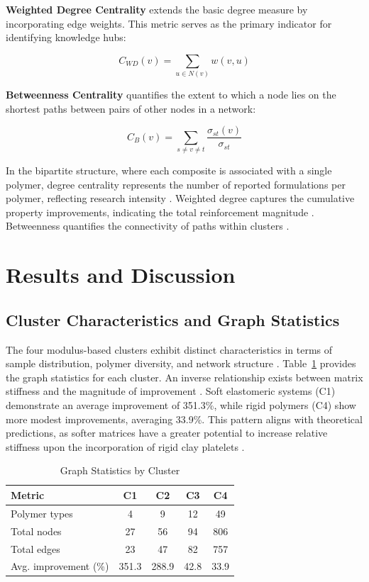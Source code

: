 \documentclass[conference]{IEEEtran}
\begin{document}
\textbf{Weighted Degree Centrality} extends the basic degree measure by incorporating edge weights. This metric serves as the primary indicator for identifying knowledge hubs:

\begin{equation}
C_{WD}(v) = \sum_{u \in N(v)} w(v, u)
\end{equation}

\textbf{Betweenness Centrality} quantifies the extent to which a node lies on the shortest paths between pairs of other nodes in a network:

\begin{equation}
C_B(v) = \sum_{s \neq v \neq t} \frac{\sigma_{st}(v)}{\sigma_{st}}
\end{equation}

In the bipartite structure, where each composite is associated with a single polymer, degree centrality represents the number of reported formulations per polymer, reflecting research intensity \cite{68, 91}. Weighted degree captures the cumulative property improvements, indicating the total reinforcement magnitude \cite{10, 11, 14}. Betweenness quantifies the connectivity of paths within clusters \cite{8, 22}.

\section{Results and Discussion}

\subsection{Cluster Characteristics and Graph Statistics}

The four modulus-based clusters exhibit distinct characteristics in terms of sample distribution, polymer diversity, and network structure \cite{68, 112, 127}. Table~\ref{tab:graph_stats} provides the graph statistics for each cluster. An inverse relationship exists between matrix stiffness and the magnitude of improvement \cite{10, 22, 25}. Soft elastomeric systems (C1) demonstrate an average improvement of 351.3\%, while rigid polymers (C4) show more modest improvements, averaging 33.9\%. This pattern aligns with theoretical predictions, as softer matrices have a greater potential to increase relative stiffness upon the incorporation of rigid clay platelets \cite{11, 14}.

\begin{table}[htbp]
\caption{Graph Statistics by Cluster}
\begin{center}
\begin{tabular}{@{}lcccc@{}}
\toprule
Metric & C1 & C2 & C3 & C4 \\
\midrule
Polymer types & 4 & 9 & 12 & 49 \\
Total nodes & 27 & 56 & 94 & 806 \\
Total edges & 23 & 47 & 82 & 757 \\
Avg. improvement (\%) & 351.3 & 288.9 & 42.8 & 33.9 \\
\bottomrule
\end{tabular}
\label{tab:graph_stats}
\end{center}
\end{table}
\end{document}
